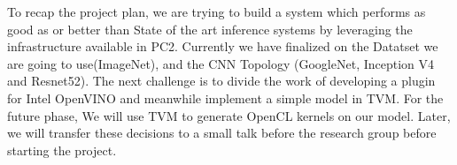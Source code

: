 \documentclass[titlepage]{report}
\begin{document}
To recap the project plan, we are trying to build a system which performs as good as or better than State of the art inference systems by leveraging the infrastructure available in PC2. Currently we have finalized on the Datatset we are going to use(ImageNet), and the CNN Topology (GoogleNet, Inception V4 and Resnet52). The next challenge is to divide the work of developing a plugin for Intel OpenVINO and meanwhile implement a simple model in TVM. For the future phase, We will use TVM to generate OpenCL kernels on our model. Later, we will transfer these decisions to a small talk before the research group before starting the project.

\end{document}
